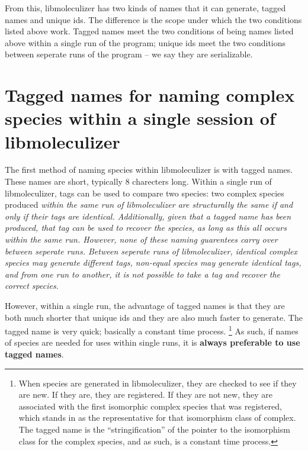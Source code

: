 From this, libmoleculizer has two kinds of names that it can
generate, tagged names and unique ids.  The difference is the scope
under which the two conditions listed above work.  Tagged names
meet the two conditions of being names listed above within a single
run of the program; unique ids meet the two conditions between
seperate runs of the program -- we say they are serializable.  


\section{Tagged names for naming complex species within a single session
  of libmoleculizer}

The first method of naming species within libmoleculizer is with
tagged names.  These names are short, typically 8 charecters long.
Within a single run of libmoleculizer, tags can be used to compare two
species: two complex species produced \it{within the same run of
  libmoleculizer} are structurally the same if and only if their tags
are identical.  Additionally, given that a tagged name has been
produced, that tag can be used to recover the species, as long as this
all occurs within the same run.  However, none of these naming
guarentees carry over between seperate runs.  Between seperate runs of
libmoleculizer, identical complex species may generate different tags,
non-equal species may generate identical tags, and from one run to
another, it is not possible to take a tag and recover the correct
species.  

However, within a single run, the advantage of tagged names is that
they are both much shorter that unique ids and they are also much
faster to generate.  The tagged name is very quick; basically a
constant time process. \footnote{When species are generated in
  libmoleculizer, they are checked to see if they are new.  If they
  are, they are registered.  If they are not new, they are associated
  with the first isomorphic complex species that was registered, which
  stands in as the representative for that isomorphism class of
  complex.  The tagged name is the ``stringification'' of the pointer
  to the isomorphism class for the complex species, and as such, is
  a constant time process.}  As such, if names of species are needed
for uses within single runs, it is \textbf{always preferable to use
  tagged names}.  


